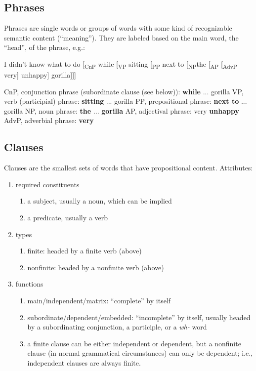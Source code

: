 \documentclass[12pt]{article}
\begin{document}
\subsection{Phrases}

Phrases are single words or groups of words with some kind of recognizable semantic content (``meaning''). They are labeled based on the main word, the ``head'', of the phrase, e.g.:
\begin{exe}
\ex I didn't know what to do [\textsubscript{CnP} while [\textsubscript{VP} sitting [\textsubscript{PP} next to [\textsubscript{NP}the [\textsubscript{AP} [\textsubscript{AdvP} very] unhappy] gorilla]]]
    \begin{xlist}
    \ex  CnP, conjunction phrase (subordinate clause (see below)): \textbf{while} ... gorilla 
    \ex VP, verb (participial) phrase: \textbf{sitting} ... gorilla
    \ex PP, prepositional phrase: \textbf{next to} ... gorilla
    \ex NP, noun phrase: \textbf{the} ... \textbf{gorilla}
    \ex AP, adjectival phrase: very \textbf{unhappy}
    \ex AdvP, adverbial phrase: \textbf{very}
    \end{xlist}
\end{exe}

\subsection{Clauses}
Clauses are the smallest sets of words that have propositional content. Attributes:
\begin{enumerate}
\item required constituents
    \begin{enumerate}
    \item a subject, usually a noun, which can be implied
    \item a predicate, usually a verb
    \end{enumerate}
\item types
    \begin{enumerate}
    \item finite: headed by a finite verb (above)
    \item nonfinite: headed by a nonfinite verb (above)
    \end{enumerate}
\item functions
    \begin{enumerate}
    \item main/independent/matrix: ``complete'' by itself
    \item subordinate/dependent/embedded: ``incomplete'' by itself, usually headed by a subordinating conjunction, a participle, or a \textit{wh-} word
    \item a finite clause can be either independent or dependent, but a nonfinite clause (in normal grammatical circumstances) can only be dependent; i.e., independent clauses are always finite.
    \end{enumerate}
\end{enumerate}
\end{document}
